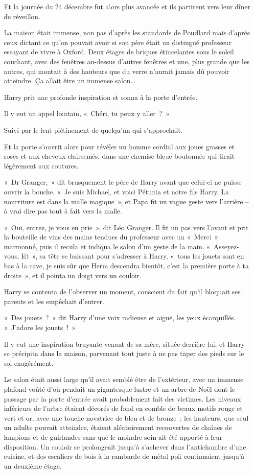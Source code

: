 Et la journée du 24 décembre fut alors plus avancée et ils partirent vers leur dîner de réveillon.

\later

La maison était immense, non pas d'après les standards de Poudlard mais d'après ceux dictant ce qu'on pouvait avoir si son père était un distingué professeur essayant de vivre à Oxford. Deux étages de briques étincelantes sous le soleil couchant, avec des fenêtres au-dessus d'autres fenêtres et une, plus grande que les autres, qui montait à des hauteurs que du verre n'aurait jamais dû pouvoir atteindre. Ça allait être un immense salon…

Harry prit une profonde inspiration et sonna à la porte d'entrée.

Il y eut un appel lointain, «~Chéri, tu peux y aller~?~»

Suivi par le lent piétinement de quelqu'un qui s'approchait.

Et la porte s'ouvrit alors pour révéler un homme cordial aux joues grasses et roses et aux cheveux clairsemés, dans une chemise bleue boutonnée qui tirait légèrement aux coutures.

«~Dr Granger,~» dit brusquement le père de Harry avant que celui-ci ne puisse ouvrir la bouche. «~Je suis Michael, et voici Pétunia et notre fils Harry. La nourriture est dans la malle magique~», et Papa fit un vague geste vers l'arrière -- à vrai dire pas tout à fait vers la malle.

«~Oui, entrez, je vous en prie~», dit Léo Granger. Il fit un pas vers l'avant et prit la bouteille de vins des mains tendues du professeur avec un «~Merci~» marmonné, puis il recula et indiqua le salon d'un geste de la main. «~Asseyez-vous. Et~», sa tête se baissant pour s'adresser à Harry, «~tous les jouets sont en bas à la cave, je suis sûr que Herm descendra bientôt, c'est la première porte à ta droite~», et il pointa un doigt vers un couloir.

Harry se contenta de l'observer un moment, conscient du fait qu'il bloquait ses parents et les empêchait d'entrer.

«~Des jouets~?~» dit Harry d'une voix radieuse et aiguë, les yeux écarquillés. «~J'adore les jouets~!~»

Il y eut une inspiration bruyante venant de sa mère, située derrière lui, et Harry se précipita dans la maison, parvenant tout juste à ne pas taper des pieds sur le sol exagérément.

Le salon était aussi large qu'il avait semblé être de l'extérieur, avec un immense plafond voûté d'où pendait un gigantesque lustre et un arbre de Noël dont le passage par la porte d'entrée avait probablement fait des victimes. Les niveaux inférieurs de l'arbre étaient décorés de fond en comble de beaux motifs rouge et vert et or, avec une touche novatrice de bleu et de bronze~; les hauteurs, que seul un adulte pouvait atteindre, étaient aléatoirement recouvertes de chaînes de lampions et de guirlandes sans que le moindre soin ait été apporté à leur disposition. Un couloir se prolongeait jusqu'à s'achever dans l'antichambre d'une cuisine, et des escaliers de bois à la rambarde de métal poli continuaient jusqu'à un deuxième étage.

